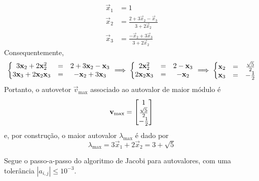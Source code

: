 \documentclass{homework}
\begin{document}
			\begin{align*}
				\vec{x}_1 &= 1\\
				\vec{x}_2 &= \frac{2 + 3 \vec{x}_2 - \vec{x}_3}{3 + 2 \vec{x}_2}\\
				\vec{x}_3 &= \frac{- \vec{x}_2 + 3  \vec{x}_3}{3 + 2 \vec{x}_2}
			\end{align*}
		Consequentemente,
			\begin{align*}\left\{\begin{array}{@{}ccc@{}}
			3 \vec{x}_2 + 2 \vec{x}_2^2 &=& 2 + 3 \vec{x}_2 - \vec{x}_3\\
			3 \vec{x}_3 + 2 \vec{x}_2 \vec{x}_3 &=& - \vec{x}_2 + 3 \vec{x}_3
			\end{array}\right. \implies \left\{\begin{array}{@{}ccc@{}}
			2 \vec{x}_2^2 &=& 2 - \vec{x}_3\\
			2 \vec{x}_2 \vec{x}_3 &=& - \vec{x}_2
			\end{array}\right. \implies \left\{\begin{array}{@{}ccc@{}}
			\vec{x}_2 &=& \frac{\sqrt{5}}{2}\\
			\vec{x}_3 &=& - \frac{1}{2}
			\end{array}\right.
			\end{align*}
		Portanto, o autovetor $\vec{v}_\text{max}$ associado ao autovalor de maior módulo é
		\begin{align*}
			\vec{v}_\text{max} = \left[\begin{array}{@{}c@{}}
			1 \\
			\frac{\sqrt{5}}{2} \\
			- \frac{1}{2}
			\end{array}\right]
		\end{align*}
		e, por construção, o maior autovalor $\lambda_\text{max}$ é dado por
			$$ \lambda_\text{max} = 3 \vec{x}_1 + 2 \vec{x}_2 = 3 + \sqrt{5} $$
			
		\subsubquest Segue o passo-a-passo do algoritmo de Jacobi para autovalores, com uma tolerância $|a_{i,j}| \le 10^{-3}$.
		
\end{document}
